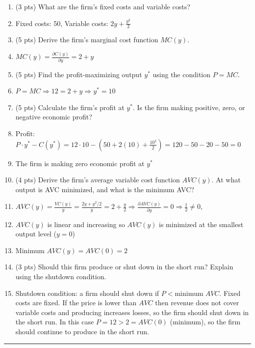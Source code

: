 \documentclass[11pt]{article}
\begin{document}
\begin{enumerate}[label=(\alph*)]
    \item (3 pts) What are the firm's fixed costs and variable costs?
    \item[] Fixed costs: 50, Variable costs: $2y+\frac{y^2}{2}$
    
    \item (5 pts) Derive the firm's marginal cost function $MC(y)$.
    \item[] $MC(y)=\frac{\partial C(y)}{\partial y}=2+y$
    
    \item (5 pts) Find the profit-maximizing output $y^*$ using the condition $P = MC$.
    \item[] $P=MC\Rightarrow12=2+y\Rightarrow y^*=10$
    
    \item (5 pts) Calculate the firm's profit at $y^*$. Is the firm making positive, zero, or negative economic profit?
    \item[] Profit: $P\cdot y^*-C(y^*)=12\cdot 10-(50+2(10)+\frac{10^2}{2})=120-50-20-50=0$
    \item[] The firm is making zero economic profit at $y^*$
    
    \item (4 pts) Derive the firm's average variable cost function $AVC(y)$. At what output is AVC minimized, and what is the minimum AVC?
    \item[] $AVC(y)=\frac{VC(y)}{y}=\frac{2y+y^2/2}{y}=2+\frac{y}{2}\Rightarrow\frac{\partial AVC(y)}{\partial y}=0\Rightarrow\frac{1}{2}\neq0$, 
    \item[] $AVC(y)$ is linear and increasing so $AVC(y)$ is minimized at the smallest output level ($y=0$)
    \item[] Minimum $AVC(y)=AVC(0)=2$
    
    \item (3 pts) Should this firm produce or shut down in the short run? Explain using the shutdown condition.
    \item[] Shutdown condition: a firm should shut down if $P<\text{minimum}\; AVC$. Fixed costs are fixed. If the price is lower than $AVC$ then revenue does not cover variable costs and producing increases losses, so the firm should shut down in the short run. In this case $P=12>2=AVC(0)$ (minimum), so the firm should continue to produce in the short run.
\end{enumerate}

\vspace{0em}
\noindent\rule{\textwidth}{0.4pt}
\end{document}

